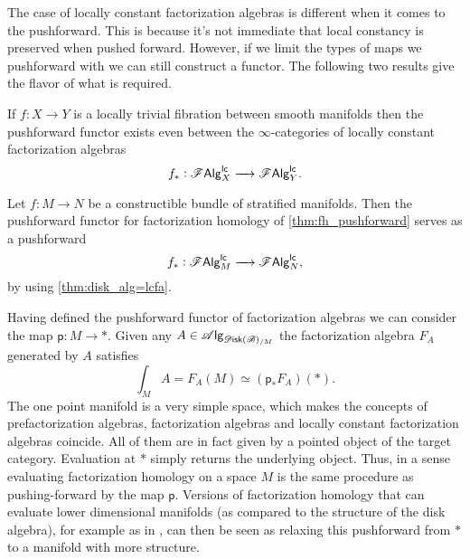 \documentclass[../text]{subfiles}
\begin{document}
The case of locally constant factorization algebras is different when it comes to the pushforward. This is because it's not immediate that local constancy is preserved when pushed forward. However, if we limit the types of maps we pushforward with we can still construct a functor. The following two results give the flavor of what is required.

\begin{proposition}
    If $f: X \rightarrow Y$ is a locally trivial fibration between smooth manifolds then the pushforward functor exists even between the $\infty$-categories of locally constant factorization algebras
    \begin{equation}
        f_*: \mathscr{F} \mathsf{Alg}^{\mathsf{lc}}_X \xrightarrow{\quad} \mathscr{F} \mathsf{Alg}^{\mathsf{lc}}_Y.
    \end{equation}
\end{proposition}

\begin{corollary}\label{cor:pushforward_for_lc}
    Let $f: M \xrightarrow{} N$ be a constructible bundle of stratified manifolds. Then the pushforward functor for factorization homology of \cref{thm:fh_pushforward} serves as a pushforward
    \begin{equation}
        f_*: \mathscr{F} \mathsf{Alg}^{\mathsf{lc}}_M \xrightarrow{\quad} \mathscr{F} \mathsf{Alg}^{\mathsf{lc}}_N,
    \end{equation}
    by using \cref{thm:disk_alg=lcfa}.
\end{corollary}

\begin{remark}\label{rem:fh_is_pushingforward}
    Having defined the pushforward functor of factorization algebras we can consider the map $\mathsf{p}:M \rightarrow *$. Given any $A \in \alg{\disk(\bstr)_{/M}}$ the factorization algebra $F_A$ generated by $A$ satisfies
    \begin{equation}
        \int_M A  = F_A(M) \simeq (\mathsf{p}_* F_A)(*).
    \end{equation}
    The one point manifold is a very simple space, which makes the concepts of prefactorization algebras, factorization algebras and locally constant factorization algebras coincide. All of them are in fact given by a pointed object of the target category. Evaluation at $*$ simply returns the underlying object. Thus, in a sense evaluating factorization homology on a space $M$ is the same procedure as pushing-forward by the map $\mathsf{p}$. Versions of factorization homology that can evaluate lower dimensional manifolds (as compared to the structure of the disk algebra), for example as in \cite[cor.2.29]{aft_fhstrat}, can then be seen as relaxing this pushforward from $*$ to a manifold with more structure.
\end{remark} 
\end{document}
